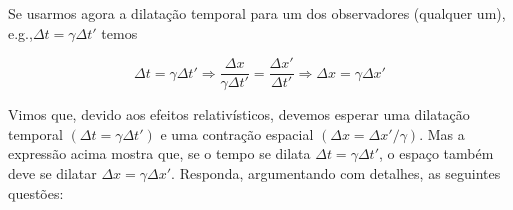 \documentclass[10pt,a4paper]{article}
\begin{document}
	Se usarmos agora a dilatação temporal para um dos observadores (qualquer um), e.g.,$\Delta t =\gamma \Delta t'$ temos 
	
	\begin{equation}\label{dilatacao espacial}
		\Delta t = \gamma \Delta t' \Rightarrow \frac{\Delta x}{\gamma \Delta t'}=\frac{\Delta x'}{\Delta t'} \Rightarrow \Delta x = \gamma \Delta x'
	\end{equation}
	
	Vimos que, devido aos efeitos relativísticos, devemos esperar uma dilatação temporal $(\Delta t = \gamma \Delta t')$ e uma contração espacial $(\Delta x = \Delta x'/\gamma)$. Mas a expressão acima mostra que, se o tempo se dilata $\Delta t = \gamma \Delta t'$, o espaço também deve se dilatar $\Delta x = \gamma \Delta x'$. Responda, argumentando
	com detalhes, as seguintes questões:
	
\end{document}
